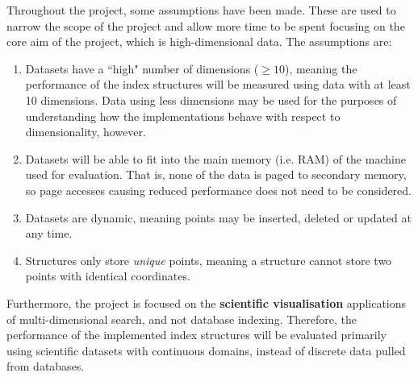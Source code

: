 Throughout the project, some assumptions have been made. These are used to narrow the scope of the project and allow more time to be spent focusing on the core aim of the project, which is high-dimensional data. The assumptions are:
\begin{enumerate}
	\item Datasets have a ``high" number of dimensions ($\geq 10$), meaning the performance of the index structures will be measured using data with at least 10 dimensions. Data using less dimensions may be used for the purposes of understanding how the implementations behave with respect to dimensionality, however.
	\item Datasets will be able to fit into the main memory (i.e. RAM) of the machine used for evaluation. That is, none of the data is paged to secondary memory, so page accesses causing reduced performance does not need to be considered.
	\item Datasets are dynamic, meaning points may be inserted, deleted or updated at any time.
	\item Structures only store \textit{unique} points, meaning a structure cannot store two points with identical coordinates.
\end{enumerate}

Furthermore, the project is focused on the \textbf{scientific visualisation} applications of multi-dimensional search, and not database indexing. Therefore, the performance of the implemented index structures will be evaluated primarily using scientific datasets with continuous domains, instead of discrete data pulled from databases.